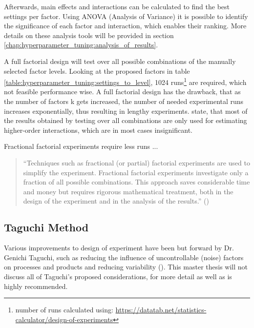 Afterwards, main effects and interactions can be calculated to find the best settings per factor. Using ANOVA (Analysis of Variance) it is possible to identify the significance of each factor and interaction, which enables their ranking. More details on these analysis tools will be provided in section \ref{chap:hyperparameter_tuning:analysis_of_results}.

A full factorial design will test over all possible combinations of the manually selected factor levels. Looking at the proposed factors in table \ref{table:hyperparameter_tuning:settings_to_level}, 1024 runs\footnote{number of runs calculated using: \url{https://datatab.net/statistics-calculator/design-of-experiments}} are required, which not feasible performance wise. A full factorial design has the drawback, that as the number of factors k gets increased, the number of needed experimental runs increases exponentially, thus resulting in lengthy experiments. \cite{yang_design_2009} state, that most of the results obtained by testing over all combinations are only used for estimating higher-order interactions, which are in most cases insignificant.

Fractional factorial experiments require less runs ... 

\begin{quote}
	\begin{em}
		\enquote{Techniques such as fractional (or partial) factorial experiments are used to simplify the experiment. Fractional factorial experiments investigate only a fraction of all possible combinations. This approach saves considerable time and money but requires rigorous mathematical treatment, both in the design of the experiment and in the analysis of the results.} (\cite{roy_primer_1990})
	\end{em}
\end{quote}


\subsection{Taguchi Method}
Various improvements to design of experiment have been but forward by Dr. Genichi Taguchi, such as reducing the influence of uncontrollable (noise) factors on processes and products and reducing variability (\cite{roy_primer_1990}). This master thesis will not discuss all of Taguchi's proposed considerations, for more detail \cite{roy_primer_1990} as well as \cite{yang_design_2009} is highly recommended.

